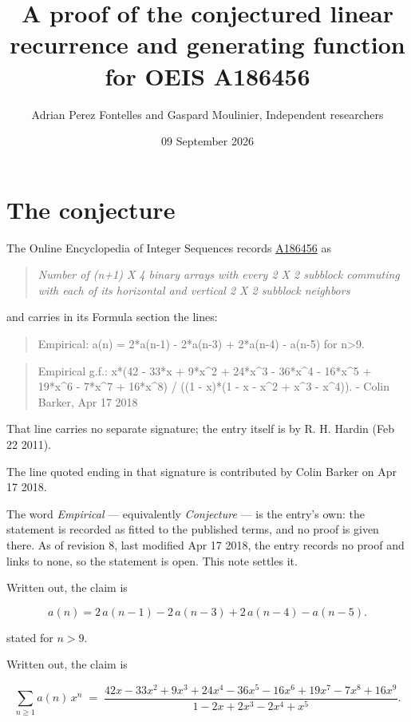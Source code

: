 \documentclass[11pt]{article}
\title{A proof of the conjectured linear recurrence and generating function for OEIS A186456}
\author{Adrian Perez Fontelles and Gaspard Moulinier, Independent researchers}
\date{09 September 2026}
\theoremstyle{definition}
\begin{document}
\maketitle
\section{The conjecture}

The Online Encyclopedia of Integer Sequences records \href{https://oeis.org/A186456}{A186456} as

\begin{quote}\itshape Number of (n+1) X 4 binary arrays with every 2 X 2 subblock commuting with each of its horizontal and vertical 2 X 2 subblock neighbors\end{quote}

and carries in its Formula section the lines:

\begin{quote}\ttfamily Empirical: a(n) = 2*a(n-1) - 2*a(n-3) + 2*a(n-4) - a(n-5) for n>9.\end{quote}

\begin{quote}\ttfamily Empirical g.f.: x*(42 - 33*x + 9*x\textasciicircum{}2 + 24*x\textasciicircum{}3 - 36*x\textasciicircum{}4 - 16*x\textasciicircum{}5 + 19*x\textasciicircum{}6 - 7*x\textasciicircum{}7 + 16*x\textasciicircum{}8) / ((1 - x)*(1 - x - x\textasciicircum{}2 + x\textasciicircum{}3 - x\textasciicircum{}4)). - Colin Barker, Apr 17 2018\end{quote}

That line carries no separate signature; the entry itself is by R. H. Hardin (Feb 22 2011).

The line quoted ending in that signature is contributed by Colin Barker on Apr 17 2018.

The word {\itshape Empirical} --- equivalently {\itshape Conjecture} --- is the entry's own: the statement is recorded as fitted to the published terms, and no proof is given there. As of revision 8, last modified Apr 17 2018, the entry records no proof and links to none, so the statement is open. This note settles it.

Written out, the claim is

\[a(n) = 2\,a(n-1) - 2\,a(n-3) + 2\,a(n-4) - a(n-5).\]

stated for $n > 9$.

Written out, the claim is

\[\sum_{n \ge 1} a(n)\,x^n \;=\; \frac{42x - 33x^{2} + 9x^{3} + 24x^{4} - 36x^{5} - 16x^{6} + 19x^{7} - 7x^{8} + 16x^{9}}{1 - 2x + 2x^{3} - 2x^{4} + x^{5}}.\]
\end{document}
